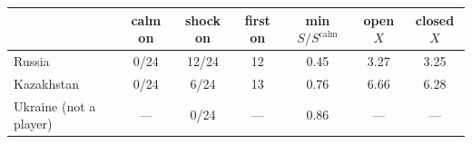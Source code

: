 \begin{center}
\small
{}
\label{tab:path}
\begin{tabular}{lcccccc}
\toprule
 & calm on & shock on & first on & min \(S/S^{\mathrm{calm}}\) & open \(X\) & closed \(X\) \\
\midrule
Russia & 0/24 & 12/24 & 12 & 0.45 & 3.27 & 3.25 \\
Kazakhstan & 0/24 & 6/24 & 13 & 0.76 & 6.66 & 6.28 \\
Ukraine (not a player) & --- & 0/24 & --- & 0.86 & --- & --- \\
\bottomrule
\end{tabular}
\end{center}
\vspace{0.6em}
